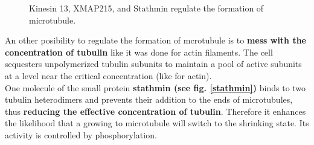 \documentclass[../main.tex]{subfiles}
\begin{document}
\begin{figure}[H]
	\centering
	\caption{Kinesin 13, XMAP215, and Stathmin regulate the formation of microtubule.}
\end{figure}

An other posibility to regulate the formation of mcrotubule is to \textbf{mess with the concentration of tubulin} like it was done for actin filaments. The cell sequesters unpolymerized tubulin subunits to maintain a pool of active subunits at a level near the critical concentration (like for actin). \\ 
\indent One molecule of the small protein \textbf{\gls{stathmin} (see fig. \ref{stathmin})} binds to two tubulin heterodimers and prevents their addition to the ends of microtubules, thus \textbf{reducing the effective concentration of tubulin}. Therefore it enhances the likelihood that a growing to microtubule will switch to the shrinking state. Its activity is controlled by phosphorylation. 
\end{document}
